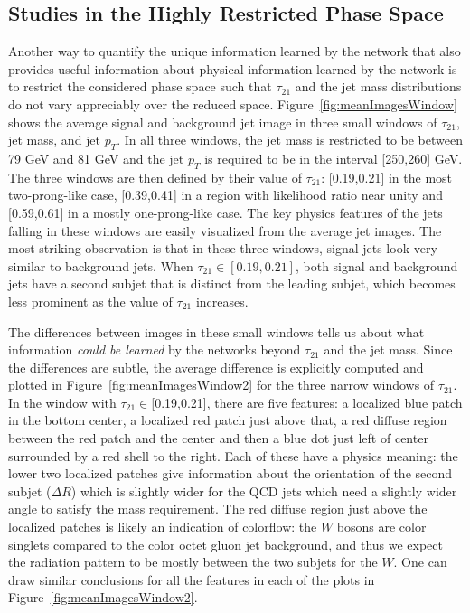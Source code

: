 
\clearpage
\newpage

\subsection{Studies in the Highly Restricted Phase Space} %
\label{sub:small_window_studies}

 Another way to quantify the unique information learned by the network that also provides useful information about physical information learned by the network is to restrict the considered phase space such that $\tau_{21}$ and the jet mass distributions do not vary appreciably over the reduced space.  Figure~\ref{fig:meanImagesWindow} shows the average signal and background jet image in three small windows of $\tau_{21}$, jet mass, and jet $p_T$.  In all three windows, the jet mass is restricted to be between 79 GeV and 81 GeV and the jet $p_T$ is required to be in the interval [250,260] GeV.  The three windows are then defined by their value of $\tau_{21}$: [0.19,0.21] in the most two-prong-like case, [0.39,0.41] in a region with likelihood ratio near unity and [0.59,0.61] in a mostly one-prong-like case.  The key physics features of the jets falling in these windows are easily visualized from the average jet images.  The most striking observation is that in these three windows, signal jets look very similar to background jets.  When $\tau_{21}\in[0.19,0.21]$, both signal and background jets have a second subjet that is distinct from the leading subjet, which becomes less prominent as the value of $\tau_{21}$ increases.  

The differences between images in these small windows tells us about what information {\it could be learned} by the networks beyond $\tau_{21}$ and the jet mass.  Since the differences are subtle, the average difference is explicitly computed and plotted in Figure~\ref{fig:meanImagesWindow2} for the three narrow windows of $\tau_{21}$.  In the window with $\tau_{21}\in$[0.19,0.21], there are five features: a localized blue patch in the bottom center, a localized red patch just above that, a red diffuse region between the red patch and the center and then a blue dot just left of center surrounded by a red shell to the right.  Each of these have a physics meaning: the lower two localized patches give information about the orientation of the second subjet ($\Delta R$) which is slightly wider for the QCD jets which need a slightly wider angle to satisfy the mass requirement.  The red diffuse region just above the localized patches is likely an indication of colorflow: the $W$ bosons are color singlets compared to the color octet gluon jet background, and thus we expect the radiation pattern to be mostly between the two subjets for the $W$.  One can draw similar conclusions for all the features in each of the plots in Figure~\ref{fig:meanImagesWindow2}.

